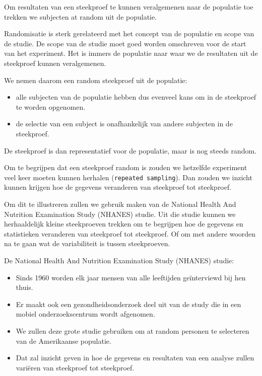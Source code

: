 \documentclass[
  12pt,dutch,coursenotes]{book}
\newcommand{\passthrough}[1]{#1}
\begin{document}
Om resultaten van een steekproef te kunnen veralgemenen naar de populatie toe trekken we subjecten at random uit de populatie.

Randomisatie is sterk gerelateerd met het concept van de populatie en scope van de studie.
De scope van de studie moet goed worden omschreven voor de start van het experiment. Het is immers de populatie naar waar we de resultaten uit de steekproef kunnen veralgemenen.

We nemen daarom een random steekproef uit de populatie:

\begin{itemize}
\item
  alle subjecten van de populatie hebben dus evenveel kans om in de steekproef te worden opgenomen.
\item
  de selectie van een subject is onafhankelijk van andere subjecten in de steekproef.
\end{itemize}

De steekproef is dan representatief voor de populatie, maar is nog steeds random.

Om te begrijpen dat een steekproef random is zouden we hetzelfde experiment veel keer moeten kunnen herhalen (\passthrough{\lstinline!repeated sampling!}). Dan zouden we inzicht kunnen krijgen hoe de gegevens veranderen van steekproef tot steekproef.

Om dit te illustreren zullen we gebruik maken van de National Health And Nutrition Examination Study (NHANES) studie. Uit die studie kunnen we herhaaldelijk kleine steekproeven trekken om te begrijpen hoe de gegevens en statistieken veranderen van steekproef tot steekproef. Of om met andere woorden na te gaan wat de variabiliteit is tussen steekproeven.

De National Health And Nutrition Examination Study (NHANES) studie:

\begin{itemize}
\item
  Sinds 1960 worden elk jaar mensen van alle leeftijden geïnterviewd bij hen thuis.
\item
  Er maakt ook een gezondheidsonderzoek deel uit van de study die in een mobiel onderzoekscentrum wordt afgenomen.
\item
  We zullen deze grote studie gebruiken om at random personen te selecteren van de Amerikaanse populatie.
\item
  Dat zal inzicht geven in hoe de gegevens en resultaten van een analyse zullen variëren van steekproef tot steekproef.
\end{itemize}
\end{document}
